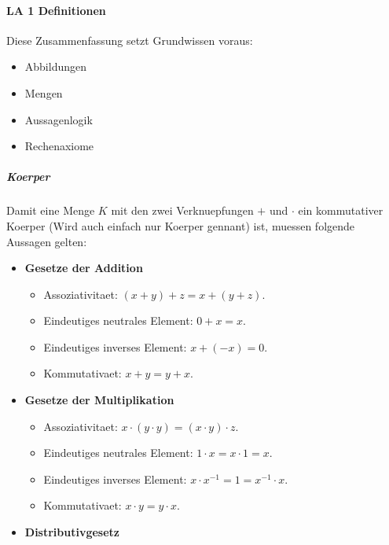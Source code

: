 \documentclass[12pt]{article}
\begin{document}
\paragraph{\Large LA 1 Definitionen}
\begin{flushleft}
    Diese Zusammenfassung setzt Grundwissen voraus:
    \begin{itemize}
        \item Abbildungen
        \item Mengen
        \item Aussagenlogik
        \item Rechenaxiome
    \end{itemize}
\end{flushleft}
\vspace{1cm}
\subparagraph{\large Koerper}
\normalsize
\begin{flushleft}
    Damit eine Menge $K$ mit den zwei Verknuepfungen $+$ und $\cdot$ ein kommutativer Koerper (Wird auch einfach nur Koerper gennant) ist, muessen folgende Aussagen gelten:
    \begin{itemize}
        \item \textbf{Gesetze der Addition}
        \begin{itemize}
            \item Assoziativitaet:
                $(x + y) + z = x + (y + z).$
            \item Eindeutiges neutrales Element:
                $0 + x = x.$
            \item Eindeutiges inverses Element: 
                $x + (-x) = 0.$
            \item Kommutativaet:
                $x + y = y + x.$
        \end{itemize}
        \item \textbf{Gesetze der Multiplikation}
        \begin{itemize}
            \item Assoziativitaet:
                $x \cdot (y \cdot y) = (x \cdot y) \cdot z.$
            \item Eindeutiges neutrales Element:
                $1 \cdot x = x \cdot 1 = x.$
            \item Eindeutiges inverses Element:
                $x \cdot x^{-1} = 1 = x^{-1} \cdot x.$
            \item Kommutativaet:
                $x \cdot y = y \cdot x.$
        \end{itemize}
        \item \textbf{Distributivgesetz}

\end{itemize}
\end{flushleft}
\end{document}
